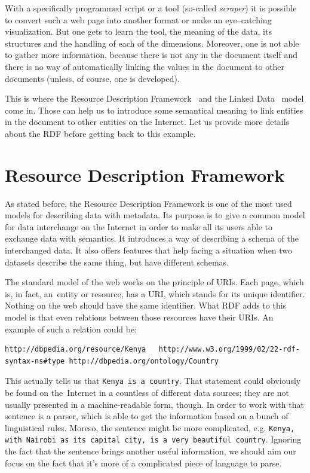 With a specifically programmed script or a tool (so-called \emph{scraper}) it is possible to
convert such a web page into another format or make an eye--catching visualization.
But one gets to learn the tool, the meaning of the data, its structures and the 
handling of each of the dimensions. Moreover, one is not able to gather more information,
because there is not any in the document itself and there is no way of
automatically linking the values in the document to other documents (unless, of course,
one is developed).

This is where the Resource Description Framework~\cite{rdf} and the Linked Data~\cite{ld}
model come in. Those
can help us to introduce some semantical meaning to link entities in the document to
other entities on the Internet. Let us provide more details about the RDF before getting
back to this example.

\section{Resource Description Framework}
As stated before, the Resource Description Framework is one of the most used models for
describing data with metadata. Its purpose is to give a common model for data interchange
on the Internet in order to make all its users able to exchange data with semantics.
It introduces a way of describing a schema of the interchanged data. It also 
offers features that help facing a situation when two datasets describe the same thing,
but have different schemas.

The standard model of the web works on the principle of URIs. Each page, which is, in fact,
an~entity or resource, has a URI, which stands for its unique identifier. Nothing on the web
should have the same identifier. What RDF adds to this model is that even relations
between those resources have their URIs. An example of such a relation could be:

\tiny\begin{verbatim}
http://dbpedia.org/resource/Kenya   http://www.w3.org/1999/02/22-rdf-syntax-ns#type http://dbpedia.org/ontology/Country  
\end{verbatim}\normalsize

This actually tells us that \texttt{Kenya is a country}. That statement could obviously be found on
the~Internet in a countless of different data sources; they are not usually presented
in a machine-readable form, though. In order to work with that sentence is a 
parser, which is able to get the information based on a bunch of linguistical rules.
Moreso, the sentence might be more complicated, e.g. \texttt{Kenya, with Nairobi as its capital city,
is a very beautiful country}. Ignoring the fact that the sentence brings another useful
information, we should aim our focus on the fact that it’s more of a complicated piece of language to parse. 

